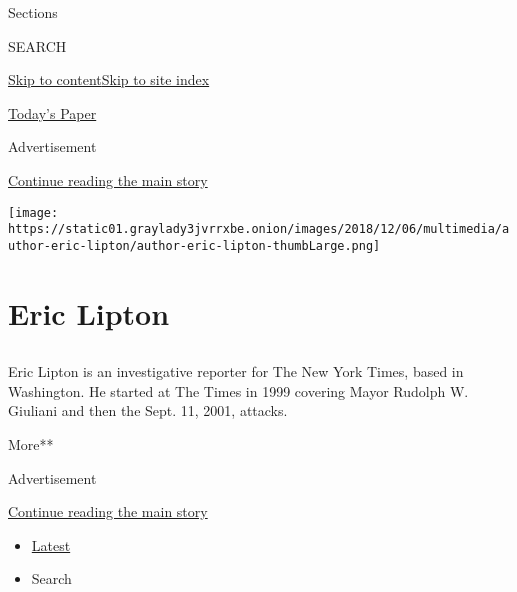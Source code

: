 Sections

SEARCH

\protect\hyperlink{site-content}{Skip to
content}\protect\hyperlink{site-index}{Skip to site index}

\href{https://myaccount.nytimes3xbfgragh.onion/auth/login?response_type=cookie\&client_id=vi}{}

\href{https://www.nytimes3xbfgragh.onion/section/todayspaper}{Today's
Paper}

Advertisement

\protect\hyperlink{after-top}{Continue reading the main story}

\texttt{[image: https://static01.graylady3jvrrxbe.onion/images/2018/12/06/multimedia/author-eric-lipton/author-eric-lipton-thumbLarge.png]}

\hypertarget{eric-lipton}{%
\section{Eric Lipton}\label{eric-lipton}}

\subsection{}

Eric Lipton is an investigative reporter for The New York Times, based
in Washington. He started at The Times in 1999 covering Mayor Rudolph W.
Giuliani and then the Sept. 11, 2001, attacks.

More**

Advertisement

\protect\hyperlink{after-mid1}{Continue reading the main story}

\begin{itemize}
\tightlist
\item
  \protect\hyperlink{stream-panel}{Latest}
\item
  Search
\end{itemize}

